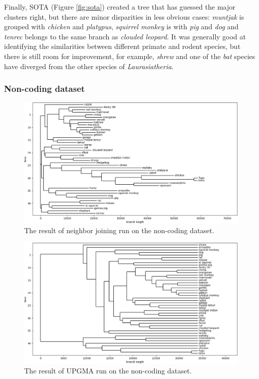 \documentclass[11pt,twocolumn]{article}
\begin{document}
Finally, SOTA (Figure \ref{fig:sota}) created a tree that has guessed the major clusters right, but there are minor disparities in less obvious cases: \textit{muntjak} is grouped with \textit{chicken} and \textit{platypus}, \textit{squirrel monkey} is with \textit{pig} and \textit{dog} and \textit{tenrec} belongs to the same branch as \textit{clouded leopard}. It was generally good at identifying the similarities between different primate and rodent species, but there is still room for improvement, for example, \textit{shrew} and one of the \textit{bat} species have diverged from the other species of \textit{Laurasiatheria}.

\subsubsection{Non-coding dataset}

\begin{figure}
    \centering
    \includegraphics[width=\linewidth]{img/nj_noncoding.png}
    \caption{The result of neighbor joining run on the non-coding dataset.}
    \label{fig:nj_noncoding}
\end{figure}

\begin{figure}
    \centering
    \includegraphics[width=\linewidth]{img/upgma_noncoding.png}
    \caption{The result of UPGMA run on the non-coding dataset.}
    \label{fig:upgma_noncoding}
\end{figure}
\end{document}
